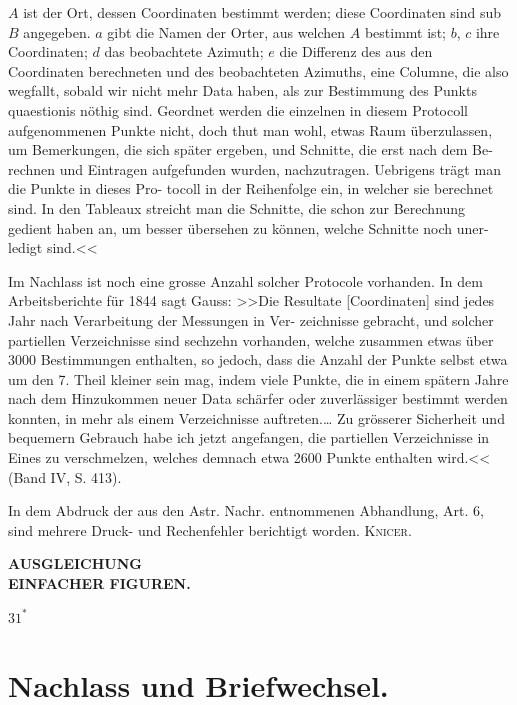 \documentclass[12pt,a4paper]{article}
\theoremstyle{plain}
\theoremstyle{definition}
\theoremstyle{remark}
\begin{document}
$A$ ist der Ort, dessen Coordinaten bestimmt werden; diese Coordinaten sind sub $B$ angegeben. $a$ gibt
die Namen der Orter, aus welchen $A$ bestimmt ist; $b$, $c$ ihre Coordinaten; $d$ das beobachtete Azimuth;
$e$ die Differenz des aus den Coordinaten berechneten und des beobachteten Azimuths, eine Columne, die
also wegfallt, sobald wir nicht mehr Data haben, als zur Bestimmung des Punkts quaestionis n\"othig sind.
Geordnet werden die einzelnen in diesem Protocoll aufgenommenen Punkte nicht, doch thut man wohl,
etwas Raum \"uberzulassen, um Bemerkungen, die sich sp\"ater ergeben, und Schnitte, die erst nach dem Be-
rechnen und Eintragen aufgefunden wurden, nachzutragen. Uebrigens tr\"agt man die Punkte in dieses Pro-
tocoll in der Reihenfolge ein, in welcher sie berechnet sind. In den Tableaux streicht man die Schnitte,
die schon zur Berechnung gedient haben an, um besser \"ubersehen zu k\"onnen, welche Schnitte noch uner-
ledigt sind.<<

Im Nachlass ist noch eine grosse Anzahl solcher Protocole vorhanden. In dem Arbeitsberichte f\"ur
1844 sagt Gauss: >>Die Resultate [Coordinaten] sind jedes Jahr nach Verarbeitung der Messungen in Ver-
zeichnisse gebracht, und solcher partiellen Verzeichnisse sind sechzehn vorhanden, welche zusammen etwas
\"uber 3000 Bestimmungen enthalten, so jedoch, dass die Anzahl der Punkte selbst etwa um den 7. Theil
kleiner sein mag, indem viele Punkte, die in einem sp\"atern Jahre nach dem Hinzukommen neuer Data
sch\"arfer oder zuverl\"assiger bestimmt werden konnten, in mehr als einem Verzeichnisse auftreten.\ldots{} Zu
gr\"osserer Sicherheit und bequemern Gebrauch habe ich jetzt angefangen, die partiellen Verzeichnisse in
Eines zu verschmelzen, welches demnach etwa 2600 Punkte enthalten wird.<< (Band IV, S. 413).

In dem Abdruck der aus den Astr. Nachr. entnommenen Abhandlung, Art. 6, sind mehrere Druck-
und Rechenfehler berichtigt worden. \textsc{Knicer}.


\newpage

\begin{center}
\textbf{AUSGLEICHUNG}\\[4pt]
\textbf{EINFACHER FIGUREN.}
\end{center}

\hfill $31^*$


\newpage
\newpage

\section*{Nachlass und Briefwechsel.}
\end{document}
